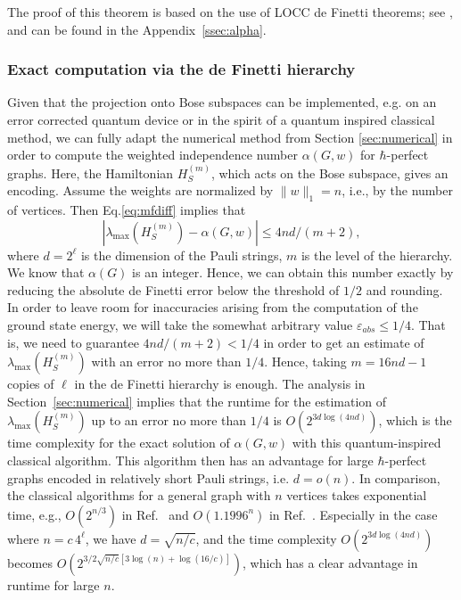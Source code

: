 \documentclass[
12pt,
prx,
aps,
reprint,
a4paper,
longbibliograph,
nofootinbib,
nobibnotes,
superscriptaddress
]{revtex4-2}
\theoremstyle{definition}
\begin{document}
The proof of this theorem is based on the use of LOCC de Finetti theorems; see  \cite{li2015quantum,brandao2013quantum}, and can be found in the Appendix~\ref{ssec:alpha}. 



\subsubsection{Exact computation via the de Finetti hierarchy}\label{ssec:exactalpha}
Given that the projection onto Bose subspaces can be  implemented, e.g. on an error corrected quantum device or in the spirit of a quantum inspired classical method, we can fully adapt the numerical method from Section \ref{sec:numerical} in order to compute  
the weighted independence number $\alpha(G,w)$ for $\hbar$-perfect graphs. Here, the Hamiltonian $H_S^{(m)}$, which acts on the Bose subspace, gives an encoding. 
Assume the weights are normalized by $\|w\|_1 = n$, i.e., by the number of vertices. Then Eq.\eqref{eq:mfdiff} implies that
\begin{equation}
	|\lambda_{\max}(H_S^{(m)}) - \alpha(G,w)| \le  4nd/(m+2),
\end{equation}
where $d=2^\ell$ is the dimension of the Pauli strings, $m$ is the level of the hierarchy. 
We know that $\alpha(G)$ is an integer. Hence, we can obtain this number exactly by reducing the absolute de Finetti error below the threshold of $1/2$ and rounding. In order to leave room for inaccuracies arising from the computation of the ground state energy, we will take the somewhat arbitrary value  $\varepsilon_{abs}\leq1/4$. 
That is, we need to guarantee $4nd/(m+2) < 1/4$ in order to get an estimate of $\lambda_{\max}(H_S^{(m)})$ with an error no more than $1/4$. Hence, taking $m = 16nd - 1$ copies of $\ell$ in the de Finetti hierarchy is enough.
The analysis in Section~\ref{sec:numerical} implies that the runtime for the estimation of $\lambda_{\max}(H_S^{(m)})$ up to an error no more than $1/4$ is $O(2^{3d\log(4nd)})$, which is the time complexity for
the exact solution of $\alpha(G,w)$ with this quantum-inspired classical algorithm. This algorithm then has an advantage for large $\hbar$-perfect graphs encoded in relatively short Pauli strings, i.e. $d = o(n)$. In comparison, the classical algorithms for a general graph with $n$ vertices takes exponential time, e.g., $O(2^{n/3})$ in Ref.~\cite{Tarjan1976FindingAM} and $O(1.1996^{n})$ in Ref.~\cite{Xiao2013ExactAF}. Especially in the case where $n = c\,4^\ell$, we have $d= \sqrt{n/c}$, and the time complexity $O(2^{3d\log(4nd)})$ becomes $O(2^{3/2\sqrt{n/c}[3\log(n) + \log(16/c)]})$, which has a clear advantage in runtime for large $n$.
\end{document}
